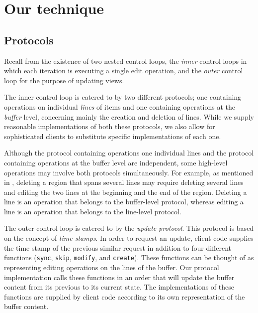 \section{Our technique}
\label{sec-our-technique}

\subsection{Protocols}

Recall from  the existence of two nested
control loops, the \emph{inner} control loops in which each iteration
is executing a single edit operation, and the \emph{outer} control
loop for the purpose of updating views.

The inner control loop is catered to by two different protocols; one
containing operations on individual \emph{lines} of items and one
containing operations at the \emph{buffer} level, concerning mainly
the creation and deletion of lines.  While we supply reasonable
implementations of both these protocols, we also allow for
sophisticated clients to substitute specific implementations of each
one.

Although the protocol containing operations one individual lines and
the protocol containing operations at the buffer level are
independent, some high-level operations may involve both protocols
simultaneously.  For example, as mentioned in
, deleting a region that spans
several lines may require deleting several lines and editing the two
lines at the beginning and the end of the region.  Deleting a line is
an operation that belongs to the buffer-level protocol, whereas
editing a line is an operation that belongs to the line-level
protocol.

The outer control loop is catered to by the \emph{update protocol}.
This protocol is based on the concept of \emph{time stamps}.  In order
to request an update, client code supplies the time stamp of the
previous similar request in addition to four different functions
(\texttt{sync}, \texttt{skip}, \texttt{modify}, and \texttt{create}).
These functions can be thought of as representing editing operations
on the lines of the buffer.  Our protocol implementation calls these
functions in an order that will update the buffer content from its
previous to its current state.  The implementations of these functions
are supplied by client code according to its own representation of the
buffer content.

